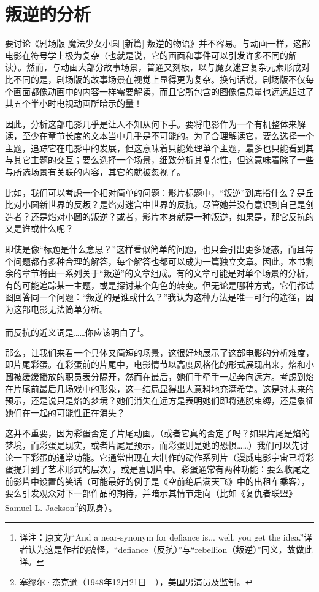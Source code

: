 \chapter{叛逆的分析}
要讨论《剧场版 魔法少女小圆 [新篇] 叛逆的物语》并不容易。与动画一样，这部电影在符号学上极为复杂（也就是说，它的画面和事件可以引发许多不同的解读）。然而，与动画大部分故事场景，普通又刻板，以与魔女迷宫复杂元素形成对比不同的是，剧场版的故事场景在视觉上显得更为复杂。换句话说，剧场版不仅每个画面都像动画中的内容一样需要解读，而且它所包含的图像信息量也远远超过了其五个半小时电视动画所暗示的量！

因此，分析这部电影几乎是让人不知从何下手。要将电影作为一个有机整体来解读，至少在章节长度的文本当中几乎是不可能的。为了合理解读它，要么选择一个主题，追踪它在电影中的发展，但这意味着只能处理单个主题，最多也只能看到其与其它主题的交互；要么选择一个场景，细致分析其复杂性，但这意味着除了一些与所选场景有关联的内容，其它的就被忽视了。

比如，我们可以考虑一个相对简单的问题：影片标题中，“叛逆”到底指什么？是丘比对小圆新世界的反叛？是焰对迷宫中世界的反抗，尽管她并没有意识到自己是创造者？还是焰对小圆的叛逆？或者，影片本身就是一种叛逆，如果是，那它反抗的又是谁或什么呢？

即使是像“标题是什么意思？”这样看似简单的问题，也只会引出更多疑惑，而且每个问题都有多种合理的解答，每个解答也都可以成为一篇独立文章。因此，本书剩余的章节将由一系列关于“叛逆”的文章组成。有的文章可能是对单个场景的分析，有的可能追踪某一主题，或是探讨某个角色的转变。但无论是哪种方式，它们都试图回答同一个问题：“叛逆的是谁或什么？”我认为这种方法是唯一可行的途径，因为这部电影无法简单分析。

而反抗的近义词是……你应该明白了\footnote{译注：原文为``And a near-synonym for defiance is... well, you get the idea.''译者认为这是作者的搞怪，``defiance（反抗）''与``rebellion（叛逆）''同义，故做此译。}。

那么，让我们来看一个具体又简短的场景，这很好地展示了这部电影的分析难度，即片尾彩蛋。在彩蛋前的片尾中，电影情节以高度风格化的形式展现出来，焰和小圆被缓缓播放的职员表分隔开，然而在最后，她们手牵手一起奔向远方。考虑到焰在片尾前最后几场戏中的形象，这一结局显得出人意料地充满希望。这是对未来的预示，还是说只是焰的梦境？她们消失在远方是表明她们即将逃脱束缚，还是象征她们在一起的可能性正在消失？

这并不重要，因为彩蛋否定了片尾动画。（或者它真的否定了吗？如果片尾是焰的梦境，而彩蛋是现实，或者片尾是预示，而彩蛋则是她的恐惧……）我们可以先讨论一下彩蛋的通常功能。它通常出现在大制作的动作系列片（漫威电影宇宙已将彩蛋提升到了艺术形式的层次），或是喜剧片中。彩蛋通常有两种功能：要么收尾之前影片中设置的笑话（可能最好的例子是《空前绝后满天飞》中的出租车乘客），要么引发观众对下一部作品的期待，并暗示其情节走向（比如《复仇者联盟》Samuel L. Jackson\footnote{塞缪尔·杰克逊（1948年12月21日—），美国男演员及监制。}的现身）。

